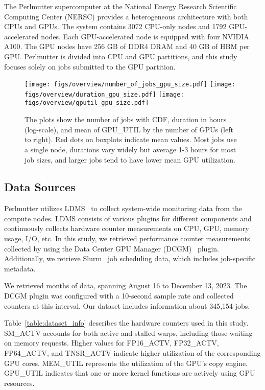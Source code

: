 The Perlmutter supercomputer at the National Energy Research Scientific
Computing Center (NERSC) provides a heterogeneous architecture with both CPUs
and GPUs. The system contains 3072 CPU-only nodes and 1792 GPU-accelerated
nodes. Each GPU-accelerated node is equipped with four NVIDIA A100.  The GPU
nodes have 256 GB of DDR4 DRAM and 40 GB of HBM per GPU. Perlmutter is divided
into CPU and GPU partitions, and this study focuses solely on jobs submitted to
the GPU partition.

\begin{figure*}[t]
  \centering
  \texttt{[image: figs/overview/number\_of\_jobs\_gpu\_size.pdf]}
  \texttt{[image: figs/overview/duration\_gpu\_size.pdf]}
  \texttt{[image: figs/overview/gputil\_gpu\_size.pdf]}
  \caption{The plots show the number of jobs with CDF, duration in hours (log-scale), and
    mean of GPU\_UTIL by the number of GPUs (left to right).
    Red dots on boxplots indicate mean values. Most jobs use a single node,
    durations vary widely but average 1-3 hours for most job sizes, and larger
    jobs tend to have lower mean GPU utilization.}
  \label{fig:num_gpus_overview}
\end{figure*}

\subsection{Data Sources}

Perlmutter utilizes LDMS~\cite{ldms} to collect system-wide monitoring
data from the compute nodes. LDMS consists of various plugins for different
components and continuously collects hardware counter measurements on
CPU, GPU, memory usage, I/O, etc. In this study, we retrieved performance
counter measurements collected by using the Data Center GPU Manager
(DCGM)~\cite{dcgm} plugin. Additionally, we retrieve Slurm~\cite{slurm_documentation}
job scheduling data, which includes job-specific metadata.

We retrieved  months of data, spanning August 16 to December 13,
2023. The DCGM plugin was configured with a 10-second sample rate and
collected counters at this interval. Our dataset includes
information about 345,154 jobs.

Table~\ref{table:dataset_info} describes the hardware counters used in this
study. SM\_ACTV accounts for both active and stalled warps, including those
waiting on memory requests. Higher values for FP16\_ACTV, FP32\_ACTV, FP64\_ACTV,
and TNSR\_ACTV indicate higher utilization of the corresponding GPU cores.
MEM\_UTIL represents the utilization of the GPU's copy engine. GPU\_UTIL indicates
that one or more kernel functions are actively using GPU resources.

